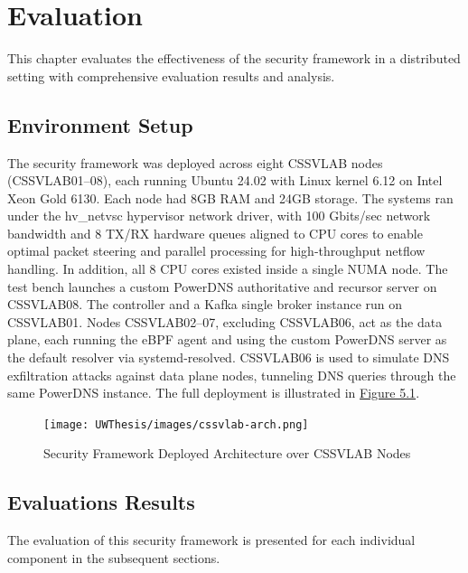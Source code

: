 \documentclass [11pt, proquest] {uwthesis}[2020/02/24]
\begin{document}





\chapter{Evaluation}
This chapter evaluates the effectiveness of the security framework in a distributed setting with  comprehensive evaluation results and analysis.


\section{Environment Setup}
The security framework was deployed across eight CSSVLAB nodes (CSSVLAB{01–08}), each running Ubuntu 24.02 with Linux kernel 6.12 on Intel Xeon Gold 6130. Each node had 8GB RAM and 24GB storage. The systems ran under the hv\_netvsc hypervisor network driver, with 100 Gbits/sec network bandwidth and 8 TX/RX hardware queues aligned to CPU cores to enable optimal packet steering and parallel processing for high-throughput netflow handling. In addition, all 8 CPU cores existed inside a single NUMA node. The test bench launches a custom PowerDNS authoritative and recursor server on CSSVLAB08. The controller and a Kafka single broker instance run on CSSVLAB01. Nodes CSSVLAB{02–07}, excluding CSSVLAB06, act as the data plane, each running the eBPF agent and using the custom PowerDNS server as the default resolver via systemd-resolved. CSSVLAB06 is used to simulate DNS exfiltration attacks against data plane nodes, tunneling DNS queries through the same PowerDNS instance. The full deployment is illustrated in \hyperref[sec:deployed-arch]{Figure 5.1}.


\begin{figure}[h]
\centering
\texttt{[image: UWThesis/images/cssvlab-arch.png]}
\caption{Security Framework Deployed Architecture over CSSVLAB Nodes}
\label{sec:deployed-arch}
\end{figure}


\section{Evaluations Results}
The evaluation of this security framework is presented for each individual component in the subsequent sections.
\end{document}

